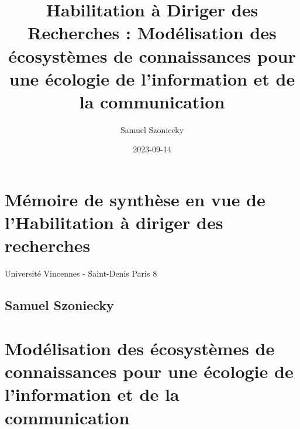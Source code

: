 \documentclass[
  letterpaper,
  DIV=11,
  numbers=noendperiod]{scrreprt}
\title{Habilitation à Diriger des Recherches : Modélisation des
écosystèmes de connaissances pour une écologie de l'information et de la
communication}
\author{Samuel Szoniecky}
\date{2023-09-14}
\renewcommand*\contentsname{Table of contents}
\newcommand\contentsname{Table of contents}
\begin{document}
\maketitle
\ifdefined\Shaded\renewenvironment{Shaded}{\begin{tcolorbox}[boxrule=0pt, frame hidden, enhanced, borderline west={3pt}{0pt}{shadecolor}, breakable, interior hidden, sharp corners]}{\end{tcolorbox}}\fi

\renewcommand*\contentsname{Table of contents}
{
\hypersetup{linkcolor=}
\setcounter{tocdepth}{3}
\tableofcontents
}

\hypertarget{memoire-de-synthese-en-vue-de-lhabilitation-a-diriger-des-recherches}{%
\chapter*{Mémoire de synthèse en vue de l'Habilitation à diriger des
recherches}\label{memoire-de-synthese-en-vue-de-lhabilitation-a-diriger-des-recherches}}


Université Vincennes - Saint-Denis Paris 8

\hypertarget{samuel-szoniecky}{%
\section*{Samuel Szoniecky}\label{samuel-szoniecky}}



\hypertarget{moduxe9lisation-des-uxe9cosystuxe8mes-de-connaissances-pour-une-uxe9cologie-de-linformation-et-de-la-communication}{%
\chapter*{Modélisation des écosystèmes de connaissances pour une
écologie de l'information et de la
communication}\label{moduxe9lisation-des-uxe9cosystuxe8mes-de-connaissances-pour-une-uxe9cologie-de-linformation-et-de-la-communication}}
\end{document}

